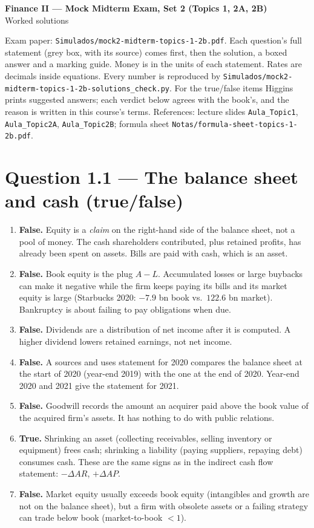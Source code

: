 \documentclass[11pt,a4paper]{article}
\numberwithin{equation}{section}
\newcommand{\statement}[1]{\par\smallskip\noindent\colorbox{black!5}{\parbox{\dimexpr\linewidth-2\fboxsep}{\small #1}}\par\medskip}
\newcommand{\TF}[3]{\item[#1] \textbf{#2.} #3}
\begin{document}
\begin{center}
  {\Large\bfseries Finance II --- Mock Midterm Exam, Set 2 (Topics 1, 2A, 2B)}\\[4pt]
  {\large Worked solutions}
\end{center}

{\sloppy\noindent Exam paper: \texttt{Simulados/mock2-midterm-topics-1-2b.pdf}. Each question's full
statement (grey box, with its source) comes first, then the solution, a boxed answer and a marking
guide. Money is in the units of each statement. Rates are decimals inside equations. Every number is
reproduced by \texttt{Simulados/mock2-midterm-topics-1-2b-solutions\_check.py}. For the true/false items
Higgins prints suggested answers; each verdict below agrees with the book's, and the reason is
written in this course's terms. References: lecture slides \texttt{Aula\_Topic1}, \texttt{Aula\_Topic2A},
\texttt{Aula\_Topic2B}; formula sheet \texttt{Notas/formula-sheet-topics-1-2b.pdf}.\par}

\section{Question 1.1 --- The balance sheet and cash (true/false)}

\statement{\QoneA}

\begin{enumerate}[leftmargin=2.2em,itemsep=4pt]
  \TF{a.}{False}{Equity is a \emph{claim} on the right-hand side of the balance sheet, not a pool of money.
  The cash shareholders contributed, plus retained profits, has already been spent on assets. Bills are
  paid with cash, which is an asset.}
  \TF{b.}{False}{Book equity is the plug $A-L$. Accumulated losses or large buybacks can make it
  negative while the firm keeps paying its bills and its market equity is large (Starbucks 2020:
  $-7.9$ bn book vs.\ $122.6$ bn market). Bankruptcy is about failing to pay obligations when due.}
  \TF{c.}{False}{Dividends are a distribution of net income after it is computed. A higher dividend
  lowers retained earnings, not net income.}
  \TF{d.}{False}{A sources and uses statement for 2020 compares the balance sheet at the start of 2020
  (year-end 2019) with the one at the end of 2020. Year-end 2020 and 2021 give the statement for 2021.}
  \TF{e.}{False}{Goodwill records the amount an acquirer paid above the book value of the acquired
  firm's assets. It has nothing to do with public relations.}
  \TF{f.}{True}{Shrinking an asset (collecting receivables, selling inventory or equipment) frees cash;
  shrinking a liability (paying suppliers, repaying debt) consumes cash. These are the same signs as in
  the indirect cash flow statement: $-\Delta AR$, $+\Delta AP$.}
  \TF{g.}{False}{Market equity usually exceeds book equity (intangibles and growth are not on the
  balance sheet), but a firm with obsolete assets or a failing strategy can trade below book
  (market-to-book $<1$).}
\end{enumerate}
\end{document}

